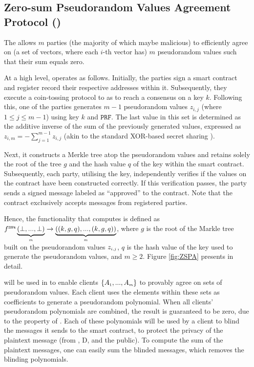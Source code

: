 

\vspace{-3.3mm}
\subsection{Zero-sum Pseudorandom Values Agreement Protocol (\zspa)}
\vspace{-1mm}

The \zspa  allows $m$ parties (the majority of which maybe malicious) to efficiently agree on (a set of vectors, where each $i$-th vector has) $m$ pseudorandom values such that their sum equals zero. 

At a high level, \zspa operates as follows. Initially, the parties sign a smart contract and register record their respective  addresses within it. Subsequently, they execute a  coin-tossing protocol to as \ct to reach a consensus on a key $k$.  Following this, one of the parties generates $m-1$ pseudorandom values $z_{\scriptscriptstyle i, j}$ (where $1\leq j\leq m-1$) using key $k$ and $\mathtt{PRF}$. The last value in this set is determined as the additive inverse of the sum of the previously generated values, expressed as
 $z_{\scriptscriptstyle i, m}=-\sum\limits^{\scriptscriptstyle m-1}_{\scriptscriptstyle j=1}z_{\scriptscriptstyle i, j}$ (akin to the standard XOR-based secret sharing \cite{Schneier0078909}). 
%

Next, it constructs a Merkle tree  atop the pseudorandom values and retains solely the root of the tree $g$ and the hash value $q$ of the key within the smart contract. Subsequently, each party, utilising the key, independently verifies if the values on the contract have been constructed correctly. If this verification passes, the party sends a signed message labeled as ``approved'' to the contract. Note that the contract exclusively accepts messages from registered parties. 

Hence, the functionality that \zspa computes is defined as $f^{\scriptscriptstyle \mathtt{ZSPA}}\underbrace{(\bot,..., \bot)}_{\scriptscriptstyle m}\rightarrow \underbrace{((k, g, q),..., (k, g,q))}_{\scriptscriptstyle m}$, where $g$ is the root of the Markle tree built on the pseudorandom values $z_{\scriptscriptstyle i, j}$, $q$ is the hash value of the key used to generate the pseudorandom values, and $m\geq 2$. Figure \ref{fig:ZSPA} presents \zspa in detail.  



\zspa will be used in \withFai to enable clients $\{A_{\scriptscriptstyle 1},...,A_{\scriptscriptstyle m}\}$ to provably agree on sets of pseudorandom values. Each client uses the elements within these sets as coefficients to generate a pseudorandom polynomial. When all clients' pseudorandom polynomials are combined, the result is guaranteed to be zero, due to the property of \zspa.  Each of these polynomials will be used by a client to blind the messages it sends to the smart contract, to protect the privacy of the plaintext message (from \aud, D, and the public). To compute the sum of the plaintext messages, one can easily sum the blinded messages, which removes the blinding polynomials. 



